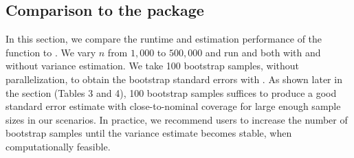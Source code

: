 \subsection[Comparison to the crr package]{Comparison to the  package}
\label{s3:crr}
In this section, we compare the runtime and estimation performance of the  function to . We vary $n$ from $1,000$ to  $500,000$ %
and run  and  both with and without variance estimation. We take 100 bootstrap samples, without parallelization, to obtain the bootstrap standard errors with . As shown later in the section (Tables 3 and 4), 100 bootstrap samples suffices to produce a good standard error estimate with close-to-nominal coverage for large enough sample sizes 
in our scenarios. In practice, we recommend users to increase the number of bootstrap samples until the variance estimate becomes stable, when computationally feasible.

